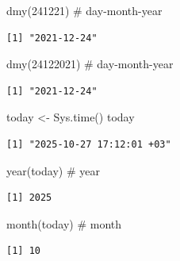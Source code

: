 \documentclass[
  letterpaper,
  DIV=11,
  numbers=noendperiod]{scrreprt}
\newenvironment{Shaded}{\begin{snugshade}}{\end{snugshade}}
\newcommand{\CommentTok}[1]{\textcolor[rgb]{0.37,0.37,0.37}{#1}}
\newcommand{\DecValTok}[1]{\textcolor[rgb]{0.68,0.00,0.00}{#1}}
\newcommand{\FunctionTok}[1]{\textcolor[rgb]{0.28,0.35,0.67}{#1}}
\newcommand{\NormalTok}[1]{\textcolor[rgb]{0.00,0.23,0.31}{#1}}
\newcommand{\OtherTok}[1]{\textcolor[rgb]{0.00,0.23,0.31}{#1}}
\begin{document}
\begin{Shaded}
\begin{Highlighting}[]
\FunctionTok{dmy}\NormalTok{(}\DecValTok{241221}\NormalTok{) }\CommentTok{\# day{-}month{-}year}
\end{Highlighting}
\end{Shaded}

\begin{verbatim}
[1] "2021-12-24"
\end{verbatim}

\begin{Shaded}
\begin{Highlighting}[]
\FunctionTok{dmy}\NormalTok{(}\DecValTok{24122021}\NormalTok{) }\CommentTok{\# day{-}month{-}year}
\end{Highlighting}
\end{Shaded}

\begin{verbatim}
[1] "2021-12-24"
\end{verbatim}

\begin{Shaded}
\begin{Highlighting}[]
\NormalTok{today }\OtherTok{\textless{}{-}} \FunctionTok{Sys.time}\NormalTok{()}
\NormalTok{today}
\end{Highlighting}
\end{Shaded}

\begin{verbatim}
[1] "2025-10-27 17:12:01 +03"
\end{verbatim}

\begin{Shaded}
\begin{Highlighting}[]
\FunctionTok{year}\NormalTok{(today) }\CommentTok{\# year}
\end{Highlighting}
\end{Shaded}

\begin{verbatim}
[1] 2025
\end{verbatim}

\begin{Shaded}
\begin{Highlighting}[]
\FunctionTok{month}\NormalTok{(today) }\CommentTok{\# month}
\end{Highlighting}
\end{Shaded}

\begin{verbatim}
[1] 10
\end{verbatim}
\end{document}
